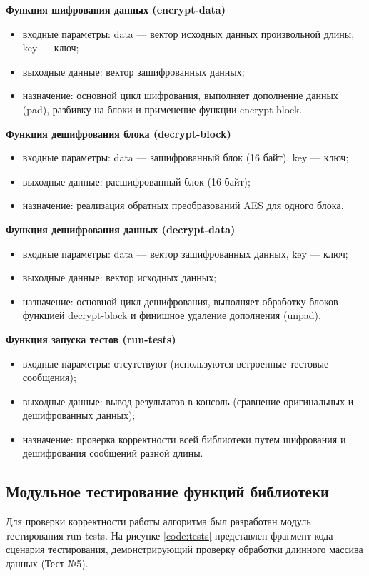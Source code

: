 \textbf{Функция шифрования данных (encrypt-data)}
\begin{itemize}
	\item входные параметры: data — вектор исходных данных произвольной длины, key — ключ;
	\item выходные данные: вектор зашифрованных данных;
	\item назначение: основной цикл шифрования, выполняет дополнение данных (pad), разбивку на блоки и применение функции encrypt-block.
\end{itemize}

\textbf{Функция дешифрования блока (decrypt-block)}
\begin{itemize}
	\item входные параметры: data — зашифрованный блок (16 байт), key — ключ;
	\item выходные данные: расшифрованный блок (16 байт);
	\item назначение: реализация обратных преобразований AES для одного блока.
\end{itemize}

\textbf{Функция дешифрования данных (decrypt-data)}
\begin{itemize}
	\item входные параметры: data — вектор зашифрованных данных, key — ключ;
	\item выходные данные: вектор исходных данных;
	\item назначение: основной цикл дешифрования, выполняет обработку блоков функцией decrypt-block и финишное удаление дополнения (unpad).
\end{itemize}

\textbf{Функция запуска тестов (run-tests)}
\begin{itemize}
	\item входные параметры: отсутствуют (используются встроенные тестовые сообщения);
	\item выходные данные: вывод результатов в консоль (сравнение оригинальных и дешифрованных данных);
	\item назначение: проверка корректности всей библиотеки путем шифрования и дешифрования сообщений разной длины.
\end{itemize}

\subsection{Модульное тестирование функций библиотеки}

Для проверки корректности работы алгоритма был разработан модуль тестирования run-tests. На рисунке \ref{code:tests} представлен фрагмент кода сценария тестирования, демонстрирующий проверку обработки длинного массива данных (Тест №5).

